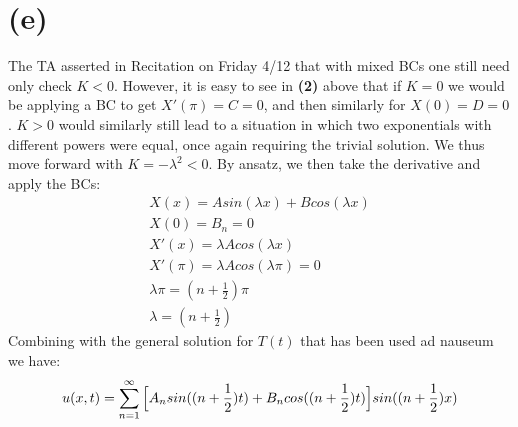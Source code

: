 \documentclass{article}
\begin{document}
\section*{\textbf{(e)}}
The TA asserted in Recitation on Friday 4/12 that with mixed BCs one still need only check $K<0$. However, it is easy to see in \textbf{(2)} above that if $K=0$ we would be applying a BC to get $X'(\pi) = C = 0$, and then similarly for $X(0) = D = 0$. $K>0$ would similarly still lead to a situation in which two exponentials with different powers were equal, once again requiring the trivial solution. We thus move forward with $K = -\lambda^2 < 0$. By ansatz, we then take the derivative and apply the BCs:
\begin{equation}
\begin{aligned}
X(x) = Asin(\lambda x) + Bcos(\lambda x)\\
X(0) = B_n = 0\\
X'(x) = \lambda Acos(\lambda x)\\
X'(\pi) = \lambda Acos(\lambda\pi) = 0\\
\lambda\pi = (n+\frac{1}{2})\pi\\
\lambda = (n+\frac{1}{2})
\end{aligned}
\end{equation}
Combining with the general solution for $T(t)$ that has been used ad nauseum we have:
\begin{equation}
\begin{aligned}
u(x,t) = \sum^{\infty}_{n=1}\Big{[}A_nsin((n+\frac{1}{2})t) + B_ncos((n+\frac{1}{2})t)\Big{]}sin((n+\frac{1}{2})x)
\end{aligned}
\end{equation}
\end{document}
